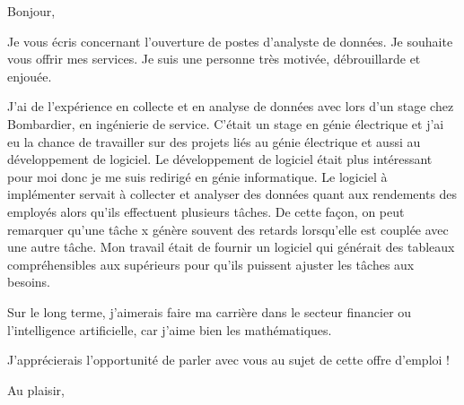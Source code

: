 \documentclass[12pt,french]{letter}
\begin{document}
\pagestyle{headings}

\begin{letter}{}
\address{Montréal, Canada}

\opening{Bonjour,}


Je vous écris concernant l'ouverture de postes d’analyste de données. Je souhaite vous offrir mes services.
Je suis une personne très motivée, débrouillarde et enjouée. 

J'ai de l'expérience en collecte et en analyse de données avec lors d'un stage chez Bombardier, en ingénierie de service. C'était un stage en génie électrique et j'ai eu la chance de travailler sur des projets liés au génie électrique et aussi au développement de logiciel. Le développement de logiciel était plus intéressant pour moi donc je me suis redirigé en génie informatique. Le logiciel à implémenter servait à collecter et analyser des données quant aux rendements des employés alors qu'ils effectuent plusieurs tâches. De cette façon, on peut remarquer qu'une tâche x génère souvent des retards lorsqu'elle est couplée avec une autre tâche. Mon travail était de fournir un logiciel qui générait des tableaux compréhensibles aux supérieurs pour qu'ils puissent ajuster les tâches aux besoins. 

Sur le long terme, j'aimerais faire ma carrière dans le secteur financier ou l'intelligence artificielle, car j'aime bien les mathématiques.

J'apprécierais l'opportunité de parler avec vous au sujet de cette offre d'emploi !

\signature{Maxime}

\closing{Au plaisir,}


\end{letter}
\end{document}
